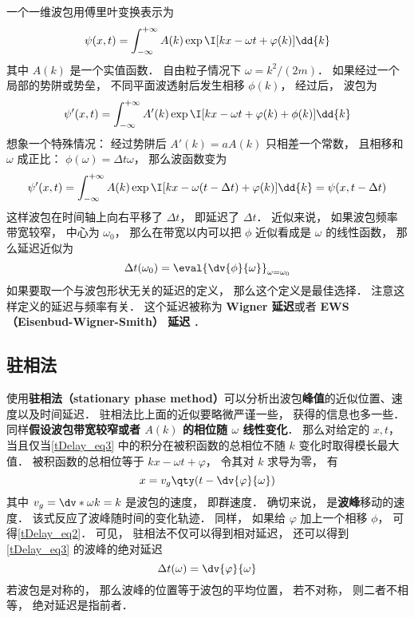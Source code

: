 
\begin{issues}
\issueDraft
\end{issues}

一个一维波包用傅里叶变换表示为
\begin{equation}\label{tDelay_eq3}
\psi(x, t) = \int_{-\infty}^{+\infty} A(k) \exp \I[ kx - \omega t + \varphi(k)] \dd{k}
\end{equation}
其中 $A(k)$ 是一个实值函数． 自由粒子情况下 $\omega = k^2/(2m)$． 如果经过一个局部的势阱或势垒， 不同平面波透射后发生相移 $\phi(k)$， 经过后， 波包为
\begin{equation}\label{tDelay_eq1}
\psi'(x, t) = \int_{-\infty}^{+\infty} A'(k) \exp \I[kx - \omega t + \varphi(k) + \phi(k)] \dd{k}
\end{equation}
想象一个特殊情况： 经过势阱后 $A'(k) = a A(k)$ 只相差一个常数， 且相移和 $\omega$ 成正比： $\phi(\omega) = \Delta t \omega$， 那么波函数变为
\begin{equation}
\psi'(x, t) = \int_{-\infty}^{+\infty} A(k) \exp \I[kx - \omega (t - \Delta t) + \varphi(k)] \dd{k}
= \psi(x, t - \Delta t)
\end{equation}
这样波包在时间轴上向右平移了 $\Delta t$， 即延迟了 $\Delta t$． 近似来说， 如果波包频率带宽较窄， 中心为 $\omega_0$， 那么在带宽以内可以把 $\phi$ 近似看成是 $\omega$ 的线性函数， 那么延迟近似为
\begin{equation}\label{tDelay_eq2}
\Delta t(\omega_0) = \eval{\dv{\phi}{\omega}}_{\omega = \omega_0}
\end{equation}
如果要取一个与波包形状无关的延迟的定义， 那么这个定义是最佳选择． 注意这样定义的延迟与频率有关． 这个延迟被称为 \textbf{Wigner 延迟}或者 \textbf{EWS （Eisenbud-Wigner-Smith） 延迟} ．

\subsection{驻相法}
使用\textbf{驻相法（stationary phase method）}可以分析出波包\textbf{峰值}的近似位置、速度以及时间延迟． 驻相法比上面的近似要略微严谨一些， 获得的信息也多一些． 同样\textbf{假设波包带宽较窄或者 $A(k)$ 的相位随 $\omega$ 线性变化}． 那么对给定的 $x, t$， 当且仅当\autoref{tDelay_eq3} 中的积分在被积函数的总相位不随 $k$ 变化时取得模长最大值． 被积函数的总相位等于 $kx - \omega t + \varphi$， 令其对 $k$ 求导为零， 有
\begin{equation}\label{tDelay_eq5}
x = v_g \qty(t - \dv{\varphi}{\omega})
\end{equation}
其中 $v_g = \dv*{\omega}{k} = k$ 是波包的速度， 即群速度． 确切来说， 是\textbf{波峰}移动的速度． 该式反应了波峰随时间的变化轨迹． 同样， 如果给 $\varphi$ 加上一个相移 $\phi$， 可得\autoref{tDelay_eq2}． 可见， 驻相法不仅可以得到相对延迟， 还可以得到\autoref{tDelay_eq3} 的波峰的绝对延迟
\begin{equation}\label{tDelay_eq4}
\Delta t(\omega) = \dv{\varphi}{\omega}
\end{equation}
若波包是对称的， 那么波峰的位置等于波包的平均位置， 若不对称， 则二者不相等， 绝对延迟是指前者．

